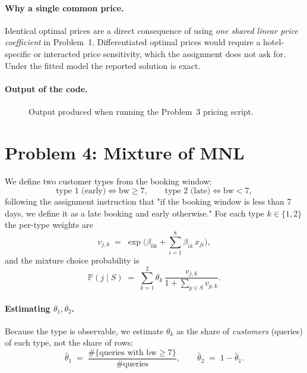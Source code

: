 \documentclass[11pt]{article}
\begin{document}
\paragraph{Why a single common price.}
Identical optimal prices are a direct consequence of using \emph{one shared
linear price coefficient} in Problem~1. Differentiated optimal prices would
require a hotel-specific or interacted price sensitivity, which the
assignment does not ask for. Under the fitted model the reported solution
is exact.

\paragraph{Output of the code.}
\begin{figure}[h!]
  \centering
  \caption{Output produced when running the Problem~3 pricing script.}
\end{figure}

\FloatBarrier
\newpage

\section*{Problem 4: Mixture of MNL}
\label{sec:p4}

We define two customer types from the booking window:
\[
\text{type 1 (early)} \iff \text{bw} \ge 7,
\qquad
\text{type 2 (late)}  \iff \text{bw} < 7,
\]
following the assignment instruction that "if the booking window is less
than 7 days, we define it as a late booking and early otherwise."
For each type $k \in \{1,2\}$ the per-type weights are
\[
v_{j,k} \;=\; \exp\!\Big(\beta_{0k} + \sum_{i=1}^{8} \beta_{ik}\, x_{ji}\Big),
\]
and the mixture choice probability is
\[
\mathbb{P}(j \mid S) \;=\; \sum_{k=1}^{2} \theta_k\,
  \frac{v_{j,k}}{1 + \sum_{p \in S} v_{p,k}}.
\]

\paragraph{Estimating $\theta_1, \theta_2$.}
Because the type is observable, we estimate $\theta_k$ as the share of
\emph{customers} (queries) of each type, not the share of rows:
\[
\hat\theta_1 \;=\; \frac{\#\{\text{queries with bw} \ge 7\}}{\#\text{queries}},
\qquad
\hat\theta_2 \;=\; 1 - \hat\theta_1.
\]
\end{document}
